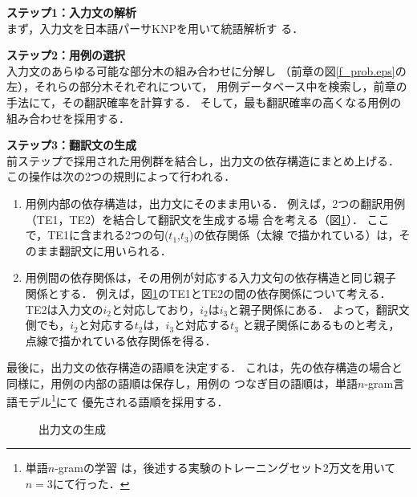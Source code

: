   \begin{description}
  \item \textbf{ステップ1：入力文の解析}\\
  まず，入力文を日本語パーサKNP\cite{Kurohashi1994}を用いて統語解析す
  る．
  \\
  \item \textbf{ステップ2：用例の選択}\\
  入力文のあらゆる可能な部分木の組み合わせに分解し
  （前章の図\ref{f_prob.eps}の左），それらの部分木それぞれについて，
  用例データベース中を検索し，前章の手法にて，その翻訳確率を計算する．
  そして，最も翻訳確率の高くなる用例の組み合わせを採用する．
  \\
  \item \textbf{ステップ3：翻訳文の生成}\\
  前ステップで採用された用例群を結合し，出力文の依存構造にまとめ上げる．
  この操作は次の2つの規則によって行われる．
  \vspace{2mm}
  \begin{enumerate}
    \item
    用例内部の依存構造は，出力文にそのまま用いる．
    例えば，2つの翻訳用例（TE1，TE2）を結合して翻訳文を生成する場
    合を考える（図\ref{f_d1.eps}）．
    ここで，TE1に含まれる2つの句($t_1$,$t_3$)の依存関係（太線
    で描かれている）は，そのまま翻訳文に用いられる．
    \\
    \item
    用例間の依存関係は，その用例が対応する入力文句の依存構造と同じ親子
    関係とする．
    例えば，図\ref{f_d1.eps}のTE1とTE2の間の依存関係について考える．
    TE2は入力文の$i_{2}$と対応しており，$i_{2}$は$i_{3}$と親子関係にある．
    よって，翻訳文側でも，$i_{2}$と対応する$t_{2}$は，$i_{3}$と対応する$t_{3}$
    と親子関係にあるものと考え，点線で描かれている依存関係を得る．
  \end{enumerate}
  
  \vspace{3mm}
  最後に，出力文の依存構造の語順を決定する．
  これは，先の依存構造の場合と同様に，用例の内部の語順は保存し，用例の
  つなぎ目の語順は，単語$n$-gram言語モデル\footnote{単語$n$-gramの学習
  は，後述する実験のトレーニングセット2万文を用いて$n=3$にて行った．}にて
  優先される語順を採用する．
  \end{description}

\begin{figure}
\begin{center}
    \epsfxsize=85mm
\end{center}
\caption{出力文の生成}
\label{f_d1.eps}
\end{figure}


